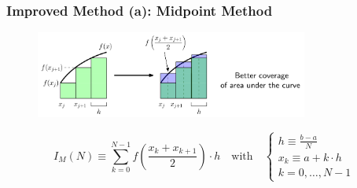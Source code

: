 \documentclass[11pt,aspectratio=169]{beamer}
\begin{document}
\begin{frame}
\frametitle{Improved Method (a): Midpoint Method}
\begin{figure}
	\centering
	\includegraphics[width=0.8\textwidth]{fig/integration-midpoint-with-text}
\end{figure}
\pause
\begin{equation*}
	I_M(N) \equiv  \sum_{k=0}^{N-1} f\left(\frac{x_k+x_{k+1}}{2}\right) \cdot h  \quad \text{with} \quad
	\begin{cases}
		h \equiv \frac{b-a}{N} \\
		x_k \equiv a + k \cdot h \\
		k = 0, \ldots, N-1
	\end{cases}
\end{equation*}


\end{frame}
\end{document}

